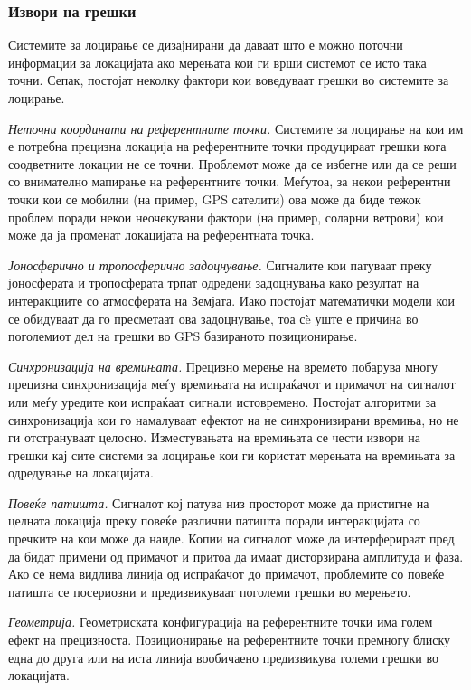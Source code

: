 \subsubsection{Извори на грешки} 

Системите за лоцирање се дизајнирани да даваат што е можно
поточни информации за локацијата ако мерењата кои ги врши системот се исто така
точни. Сепак, постојат неколку фактори кои воведуваат грешки во системите за
лоцирање. 

\emph{Неточни координати на референтните точки.} Системите за лоцирање на кои
им е потребна прецизна локација на референтните точки продуцираат грешки кога
соодветните локации не се точни. Проблемот може да се избегне или да се реши со
внимателно мапирање на референтните точки. Меѓутоа, за некои референтни точки
кои се мобилни (на пример, GPS сателити) ова може да биде тежок проблем поради
некои неочекувани фактори (на пример, соларни ветрови) кои може да ја променат
локацијата на референтната точка. 

\emph{Јоносферично и тропосферично задоцнување.} Сигналите кои патуваат преку
јоносферата и тропосферата трпат одредени задоцнувања како резултат на интеракциите со атмосферата на Земјата. Иако
постојат математички модели кои се обидуваат да го пресметаат ова задоцнување,
тоа сè уште е причина во поголемиот дел на грешки во GPS базираното
позиционирање. 

\emph{Синхронизација на времињата.} Прецизно мерење на времето побарува
многу прецизна синхронизација меѓу времињата на испраќачот и примачот на
сигналот или меѓу уредите кои испраќаат сигнали истовремено. Постојат алгоритми
за синхронизација кои го намалуваат ефектот на не синхронизирани времиња, но не
ги отстрануваат целосно. Изместувањата на времињата се чести извори на грешки
кај сите системи за лоцирање кои ги користат мерењата на времињата за одредување
на локацијата. 

\emph{Повеќе патишта.} Сигналот кој патува низ просторот може да
пристигне на целната локација преку повеќе различни патишта поради интеракцијата
со пречките на кои може да наиде. Копии на сигналот може да интерферираат пред
да бидат примени од примачот и притоа да имаат дисторзирана амплитуда и фаза.
Ако се нема видлива линија од испраќачот до примачот, проблемите со повеќе
патишта се посериозни и предизвикуваат поголеми грешки во мерењето. 

\emph{Геометрија.} Геометриската конфигурација на референтните точки има голем
ефект на прецизноста. Позиционирање на референтните точки премногу блиску една до друга
или на иста линија вообичаено предизвикува големи грешки во локацијата.

